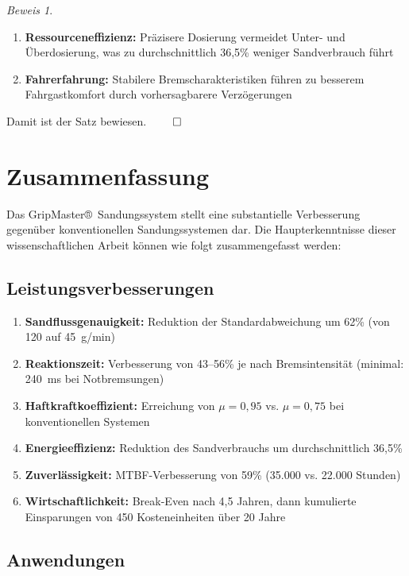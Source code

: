 \documentclass[a4paper,12pt]{article}
\theoremstyle{definition}
\theoremstyle{remark}
\newtheorem*{beweis}{Beweis}
\begin{document}
\begin{beweis}
\begin{enumerate}
\item \textbf{Ressourceneffizienz:} Präzisere Dosierung vermeidet Unter- und Überdosierung, was zu durchschnittlich 36,5\% weniger Sandverbrauch führt

\item \textbf{Fahrerfahrung:} Stabilere Bremscharakteristiken führen zu besserem Fahrgastkomfort durch vorhersagbarere Verzögerungen
\end{enumerate}

Damit ist der Satz bewiesen. $\qed$
\end{beweis}

\section{Zusammenfassung}

Das GripMaster®~Sandungssystem stellt eine substantielle Verbesserung gegenüber konventionellen Sandungssystemen dar. Die Haupterkenntnisse dieser wissenschaftlichen Arbeit können wie folgt zusammengefasst werden:

\subsection{Leistungsverbesserungen}

\begin{enumerate}
	\item \textbf{Sandflussgenauigkeit:} Reduktion der Standardabweichung um 62\% (von 120 auf 45~g/min)
	\item \textbf{Reaktionszeit:} Verbesserung von 43--56\% je nach Bremsintensität (minimal: 240~ms bei Notbremsungen)
	\item \textbf{Haftkraftkoeffizient:} Erreichung von $\mu = 0,95$ vs. $\mu = 0,75$ bei konventionellen Systemen
	\item \textbf{Energieeffizienz:} Reduktion des Sandverbrauchs um durchschnittlich 36,5\%
	\item \textbf{Zuverlässigkeit:} MTBF-Verbesserung von 59\% (35.000 vs. 22.000 Stunden)
	\item \textbf{Wirtschaftlichkeit:} Break-Even nach 4,5 Jahren, dann kumulierte Einsparungen von 450 Kosteneinheiten über 20 Jahre
\end{enumerate}

\subsection{Anwendungen}
\end{document}
